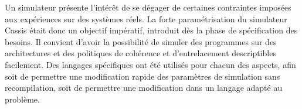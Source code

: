 Un simulateur présente l'intérêt de se dégager de certaines contraintes imposées aux expériences sur des systèmes réels. La forte paramétrisation du simulateur \textsf{Cassis} était donc un objectif impératif, introduit dès la phase de spécification des besoins. Il convient d'avoir la possibilité de simuler des programmes sur des architectures et des politiques de cohérence et d'entrelacement descriptibles facilement. Des langages spécifiques ont été utilisés pour chacun des aspects, afin soit de permettre une modification rapide des paramètres de simulation sans recompilation, soit de permettre une modification dans un langage adapté au problème.




